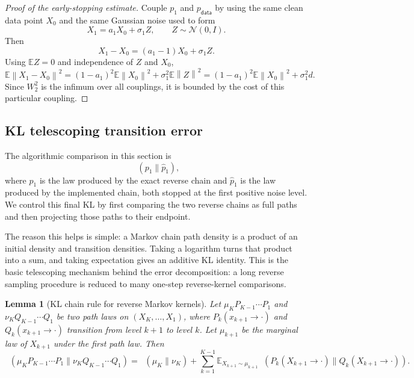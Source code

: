 \documentclass{amsart}
\numberwithin{equation}{section}
\theoremstyle{plain}
\newtheorem{lemma}[theorem]{Lemma}
\theoremstyle{definition}
\theoremstyle{remark}
\DeclareMathOperator{\KL}{D_{\mathsf{KL}}}
\newcommand{\E}{\mathbb{E}}
\newcommand{\Id}{I}
\newcommand{\wh}[1]{\widehat{#1}}
\newcommand{\norm}[1]{\left\lVert #1 \right\rVert}
\newcommand{\pdata}{p_{\mathsf{data}}}
\newcommand{\normal}[2]{\mathcal{N}\!\left(#1,#2\right)}
\begin{document}
\begin{proof}[Proof of the early-stopping estimate]
Couple $p_1$ and $\pdata$ by using the same clean data point $X_0$ and the
same Gaussian noise used to form
\[
    X_1=a_1X_0+\sigma_1Z,\qquad Z\sim\normal{0}{\Id}.
\]
Then
\[
    X_1-X_0=(a_1-1)X_0+\sigma_1Z.
\]
Using $\E Z=0$ and independence of $Z$ and $X_0$,
\[
    \E\norm{X_1-X_0}^2
    =
    (1-a_1)^2\E\norm{X_0}^2+\sigma_1^2\E\norm{Z}^2
    =
    (1-a_1)^2\E\norm{X_0}^2+\sigma_1^2d.
\]
Since $W_2^2$ is the infimum over all couplings, it is bounded by the cost
of this particular coupling.
\end{proof}

\subsection{KL telescoping transition error}

The algorithmic comparison in this section is
\[
    \KL(p_1\|\wh p_1),
\]
where $p_1$ is the law produced by the exact reverse chain and $\wh p_1$ is the
law produced by the implemented chain, both stopped at the first positive noise
level.  We control this final KL by first comparing the two reverse chains as
full paths and then projecting those paths to their endpoint.

The reason this helps is simple: a Markov chain path density is a product of an
initial density and transition densities.  Taking a logarithm turns that product
into a sum, and taking expectation gives an additive KL identity.  This is the
basic telescoping mechanism behind the error decomposition: a long reverse
sampling procedure is reduced to many one-step reverse-kernel comparisons.

\begin{lemma}[KL chain rule for reverse Markov kernels]\label{lem:kl-chain}
Let $\mu_KP_{K-1}\cdots P_1$ and $\nu_KQ_{K-1}\cdots Q_1$ be two path laws on
$(X_K,\ldots,X_1)$, where $P_k(x_{k+1} \to \cdot)$ and
$Q_k(x_{k+1} \to \cdot)$ transition from level $k+1$ to level $k$.  Let
$\mu_{k+1}$ be the marginal law of $X_{k+1}$ under the first path law.  Then
\[
    \KL(\mu_KP_{K-1}\cdots P_1\|\nu_KQ_{K-1}\cdots Q_1)
    =
    \KL(\mu_K\|\nu_K)
    +
    \sum_{k=1}^{K-1}
    \E_{X_{k+1}\sim\mu_{k+1}}
    \KL(P_k(X_{k+1} \to \cdot)\|Q_k(X_{k+1} \to \cdot)).
\]
\end{lemma}
\end{document}

